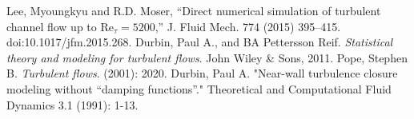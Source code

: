 \documentclass[a4paper,11pt]{article}
\begin{document}
\clearpage
\begin{thebibliography}{3}
Lee, Myoungkyu and R.D. Moser, ``Direct numerical simulation of turbulent channel flow up to $\mathrm{Re}_{\tau}=5200$,'' J. Fluid Mech. 774 (2015) 395–415. doi:10.1017/jfm.2015.268.
    Durbin, Paul A., and BA Pettersson Reif. \textit{Statistical theory and
modeling for turbulent flows}. John Wiley \& Sons, 2011.
        Pope, Stephen B. \textit{Turbulent flows}. (2001): 2020.
        Durbin, Paul A. "Near-wall turbulence closure modeling without “damping
functions”." Theoretical and Computational Fluid Dynamics 3.1 (1991): 1-13.
 
\newpage



\end{thebibliography}
\end{document}
